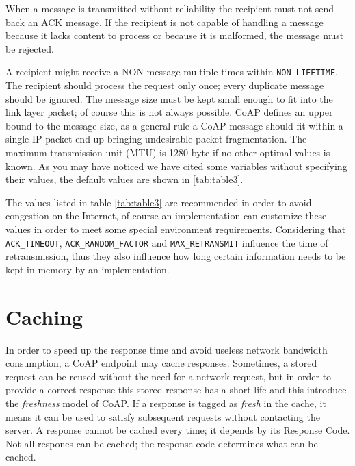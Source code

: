 	When a message is transmitted without reliability the recipient must not send back an ACK message.\newline
	If the recipient is not capable of handling a message because it lacks content to process or because it is malformed, the message must be rejected.\newline
	
	A recipient might receive a NON message multiple times within \texttt{NON\_LIFETIME}.\newline
	The recipient should process the request only once; every duplicate message should be ignored.\newline
	The message size must be kept small enough to fit into the link layer packet; of course this is not always possible.\newline
	CoAP defines an upper bound to the message size, as a general rule a CoAP message should fit within a single IP packet end up bringing undesirable packet fragmentation.\newline
	The maximum transmission unit (MTU) is 1280 byte if no other optimal values is known.\newline
	As you may have noticed we have cited some variables without specifying their values, the default values are shown in \ref{tab:table3}.\newline
	
	

	The values listed in table \ref{tab:table3} are recommended in order to avoid congestion on the Internet, of course an implementation can customize these values in order to meet some special environment requirements.\newline
	Considering that \texttt{ACK\_TIMEOUT}, \texttt{ACK\_RANDOM\_FACTOR} and \texttt{MAX\_RETRANSMIT} influence the time of retransmission, thus they also influence how long certain information needs to be kept in memory by an implementation.\newline
	
	\section{Caching}
	In order to speed up the response time and avoid useless network bandwidth consumption, a CoAP endpoint may cache responses.\newline
	Sometimes, a stored request can be reused without the need for a network request, but in order to provide a correct response this stored response has a short life and this introduce the \emph{freshness} model of CoAP.\newline
	If a response is tagged as \emph{fresh} in the cache, it means it can be used to satisfy subsequent requests without contacting the server.\newline
	A response cannot be cached every time; it depends by its Response Code.\newline
	Not all respones can be cached; the response code determines what can be cached.
	

